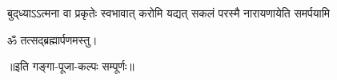 {बुद्‌ध्याऽऽत्मना वा प्रकृतेः स्वभावात्}
{करोमि यद्यत् सकलं परस्मै}
{नारायणायेति समर्पयामि}

\medskip


\medskip

\centerline{ॐ तत्सद्ब्रह्मार्पणमस्तु।}

\centerline{॥इति गङ्गा-पूजा-कल्पः सम्पूर्णः॥}



\closesection
